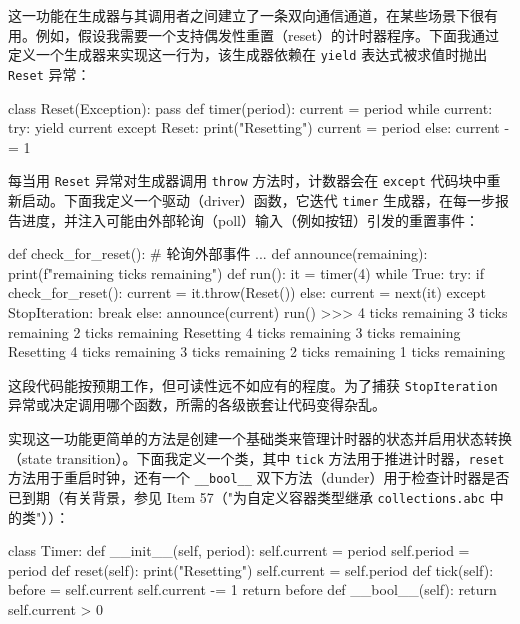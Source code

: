 这一功能在生成器与其调用者之间建立了一条双向通信通道，在某些场景下很有用。例如，假设我需要一个支持偶发性重置（reset）的计时器程序。下面我通过定义一个生成器来实现这一行为，该生成器依赖在 \texttt{yield} 表达式被求值时抛出 \texttt{Reset} 异常：

\begin{codebox}[python]
class Reset(Exception):
    pass
def timer(period):
    current = period
    while current:
        try:
            yield current
        except Reset:
            print("Resetting")
            current = period
        else:
            current -= 1
\end{codebox}

每当用 \texttt{Reset} 异常对生成器调用 \texttt{throw} 方法时，计数器会在 \texttt{except} 代码块中重新启动。下面我定义一个驱动（driver）函数，它迭代 \texttt{timer} 生成器，在每一步报告进度，并注入可能由外部轮询（poll）输入（例如按钮）引发的重置事件：

\begin{codebox}[python]
def check_for_reset():
    # 轮询外部事件
    ...
def announce(remaining):
    print(f"{remaining} ticks remaining")
def run():
    it = timer(4)
    while True:
        try:
            if check_for_reset():
                current = it.throw(Reset())
            else:
                current = next(it)
        except StopIteration:
            break
        else:
            announce(current)
run()
>>>
4 ticks remaining
3 ticks remaining
2 ticks remaining
Resetting
4 ticks remaining
3 ticks remaining
Resetting
4 ticks remaining
3 ticks remaining
2 ticks remaining
1 ticks remaining
\end{codebox}

这段代码能按预期工作，但可读性远不如应有的程度。为了捕获 \texttt{StopIteration} 异常或决定调用哪个函数，所需的各级嵌套让代码变得杂乱。

实现这一功能更简单的方法是创建一个基础类来管理计时器的状态并启用状态转换（state transition）。下面我定义一个类，其中 \texttt{tick} 方法用于推进计时器，\texttt{reset} 方法用于重启时钟，还有一个 \texttt{\_\_bool\_\_} 双下方法（dunder）用于检查计时器是否已到期（有关背景，参见 Item 57（"为自定义容器类型继承 \texttt{collections.abc} 中的类"））：

\begin{codebox}[python]
class Timer:
    def __init__(self, period):
        self.current = period
        self.period = period
    def reset(self):
        print("Resetting")
        self.current = self.period
    def tick(self):
        before = self.current
        self.current -= 1
        return before
    def __bool__(self):
        return self.current > 0
\end{codebox}

